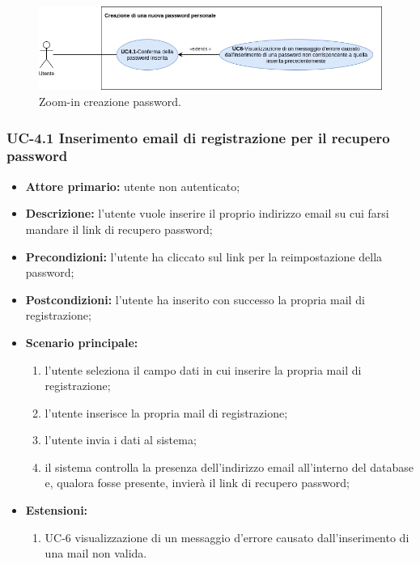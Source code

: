 \begin{figure}[H]
	\centering
	\includegraphics[width=\textwidth]{src/CasiDUso/immagini/SottocasoCreazionePassword.png}
	\caption{Zoom-in creazione password.}
\end{figure}

\subsubsection{UC-4.1 Inserimento email di registrazione per il recupero password}
\begin{itemize}
	\item \textbf{Attore primario:} utente non autenticato;

	\item \textbf{Descrizione:} l'utente vuole inserire il proprio indirizzo email su cui farsi mandare il link di recupero password;

	\item \textbf{Precondizioni:} l'utente ha cliccato sul link per la reimpostazione della password;

	\item \textbf{Postcondizioni:} l'utente ha inserito con successo la propria mail di registrazione;

	\item \textbf{Scenario principale:}
	      \begin{enumerate}
		      \item l'utente seleziona il campo dati in cui inserire la propria mail di registrazione;
		      \item l'utente inserisce la propria mail di registrazione;
		      \item l'utente invia i dati al sistema;
		      \item il sistema controlla la presenza dell'indirizzo email all'interno del database e, qualora fosse presente, invierà il link di recupero password;
	      \end{enumerate}
	\item \textbf{Estensioni:}
	      \begin{enumerate}
		      \item UC-6 visualizzazione di un messaggio d'errore causato dall'inserimento di una mail non valida.
	      \end{enumerate}
\end{itemize}

